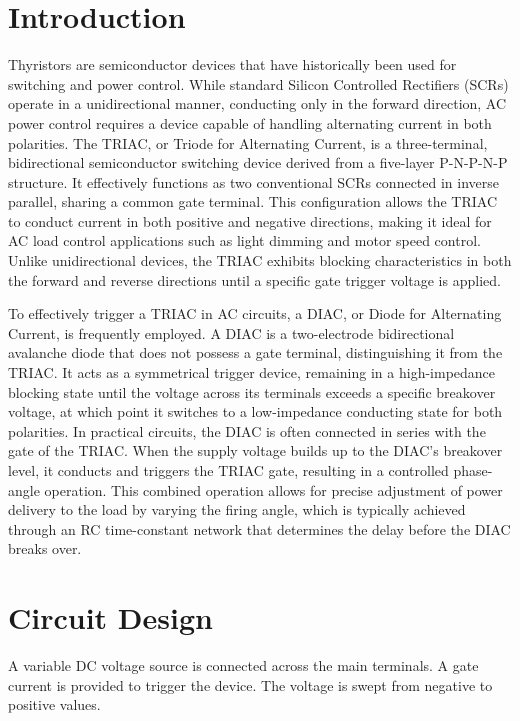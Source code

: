 \documentclass[12pt,a4paper]{article}
\begin{document}
\section{Introduction}
Thyristors are semiconductor devices that have historically been used for switching and power control. While standard Silicon Controlled Rectifiers (SCRs) operate in a unidirectional manner, conducting only in the forward direction, AC power control requires a device capable of handling alternating current in both polarities. The TRIAC, or Triode for Alternating Current, is a three-terminal, bidirectional semiconductor switching device derived from a five-layer P-N-P-N-P structure. It effectively functions as two conventional SCRs connected in inverse parallel, sharing a common gate terminal. This configuration allows the TRIAC to conduct current in both positive and negative directions, making it ideal for AC load control applications such as light dimming and motor speed control. Unlike unidirectional devices, the TRIAC exhibits blocking characteristics in both the forward and reverse directions until a specific gate trigger voltage is applied.

To effectively trigger a TRIAC in AC circuits, a DIAC, or Diode for Alternating Current, is frequently employed. A DIAC is a two-electrode bidirectional avalanche diode that does not possess a gate terminal, distinguishing it from the TRIAC. It acts as a symmetrical trigger device, remaining in a high-impedance blocking state until the voltage across its terminals exceeds a specific breakover voltage, at which point it switches to a low-impedance conducting state for both polarities. In practical circuits, the DIAC is often connected in series with the gate of the TRIAC. When the supply voltage builds up to the DIAC's breakover level, it conducts and triggers the TRIAC gate, resulting in a controlled phase-angle operation. This combined operation allows for precise adjustment of power delivery to the load by varying the firing angle, which is typically achieved through an RC time-constant network that determines the delay before the DIAC breaks over.



\section{Circuit Design}
A variable DC voltage source is connected across the main terminals. A gate current is provided to trigger the device. The voltage is swept from negative to positive values.
\end{document}
